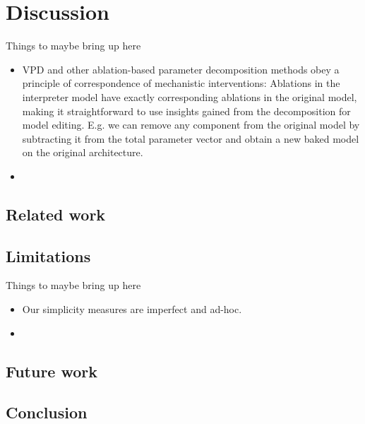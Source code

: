 \documentclass{article}
\begin{document}
\section{Discussion}
\label{sec:discussion}
Things to maybe bring up here
\begin{itemize}
    \item VPD and other ablation-based parameter decomposition methods obey a principle of correspondence of mechanistic interventions: Ablations in the interpreter model have exactly corresponding ablations in the original model, making it straightforward to use insights gained from the decomposition for model editing. E.g. we can remove any component from the original model by subtracting it from the total parameter vector and obtain a new baked model on the original architecture.
    \item 
\end{itemize}

\subsection{Related work}

\subsection{Limitations}
Things to maybe bring up here
\begin{itemize}
    \item Our simplicity measures are imperfect and ad-hoc. 
    \item 
\end{itemize}

\subsection{Future work}

\subsection{Conclusion}

\newpage













\end{document}
